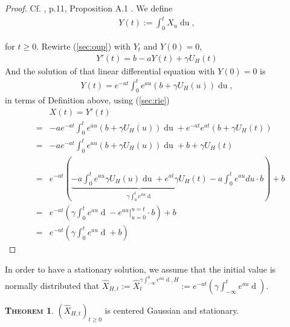 \documentclass[a4paper, twoside, 11pt]{article}
\theoremstyle{definition}
\newtheorem{theorem}[definition]{\scshape Theorem}
\newcommand{\brkt}[1]{\left({#1} \right)}
\begin{document}
\begin{proof}
  Cf. \cite{chriel}, p.11, Proposition A.1 . We define
  \begin{eqnarray*}
	Y(t):=\int_0^t X_u \mathop{du},
  \end{eqnarray*}
 
 for $t\ge 0$. Rewirte (\ref{sec:oup}) with $Y_t$ and $Y(0)=0$,
  \begin{eqnarray*}
	Y'(t) = b - aY(t) + \gamma U_H(t)
  \end{eqnarray*}
  And the solution of that linear differential equation with $Y(0)=0$ is
  \begin{eqnarray*}
	Y(t) = e^{-at}\int_0^t e^{au}(b+\gamma U_H(u)) \mathop{du},
  \end{eqnarray*}
  in terms of Definition above, using (\ref{sec:rie})
	\begin{eqnarray*}
	&&X(t) =  Y'(t)\\
	&=& -ae^{-at}\int_0^t e^{au}(b+\gamma U_H(u)) \mathop{du} + e^{-at}e^{at}(b+\gamma U_H(t)) \\
	&=&  -ae^{-at}\int_0^t e^{au}(b+\gamma U_H(u)) \mathop{du} + b +\gamma U_H(t)\\
	&=& e^{-at} \brkt{\underbrace{-a\int_0^t e^{au} \gamma U_H(u) \mathop{du} + e^{at}\gamma U_H(t)}_{\gamma\int_0^t e^{au} \mathop{dU_H(u)}} -a\int_0^t e^{au} du \cdot b } + b\\
  &=&  e^{-at} \brkt{\gamma\int_0^t e^{au} \mathop{dU_H(u)} - e^{au}|^{u=t}_{u=0} \cdot b } + b\\
  &=&  e^{-at} \brkt{\gamma\int_0^t e^{au} \mathop{dU_H(u)} + b}
	\end{eqnarray*}
\end{proof}

In order to have a stationary solution, we assume that the initial value is normally distributed that $\hat{X}_{H,t}:= \hat{X}_t^{\gamma\int_{-\infty}^0 e^{au}\mathop{dU_H(u)}, H} := e^{-at}\brkt{\gamma\int_{-\infty}^t e^{au}\mathop{dU_H(u)}}$.
\begin{theorem}
  $(\hat{X}_{H,t})_{t\ge 0}$ is centered Gaussian and stationary.
  \label{sec:gsp}
\end{theorem}
\end{document}
